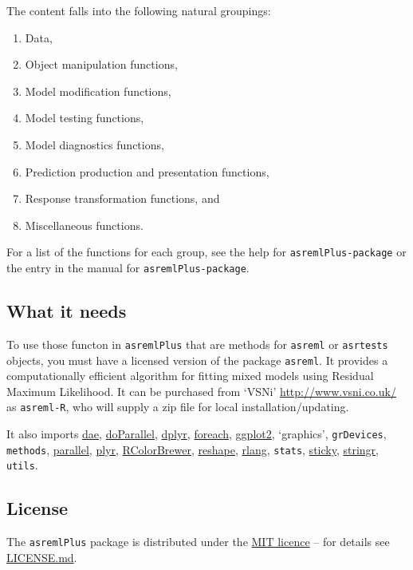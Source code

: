 \documentclass[
]{article}
\begin{document}
The content falls into the following natural groupings:

\begin{enumerate}
\def\labelenumi{(\roman{enumi})}
\item
  Data,
\item
  Object manipulation functions,
\item
  Model modification functions,
\item
  Model testing functions,
\item
  Model diagnostics functions,
\item
  Prediction production and presentation functions,
\item
  Response transformation functions, and
\item
  Miscellaneous functions.
\end{enumerate}

For a list of the functions for each group, see the help for
\texttt{asremlPlus-package} or the entry in the manual for
\texttt{asremlPlus-package}.

\hypertarget{what-it-needs}{%
\subsection{What it needs}\label{what-it-needs}}

To use those functon in \texttt{asremlPlus} that are methods for
\texttt{asreml} or \texttt{asrtests} objects, you must have a licensed
version of the package \texttt{asreml}. It provides a computationally
efficient algorithm for fitting mixed models using Residual Maximum
Likelihood. It can be purchased from `VSNi' \url{http://www.vsni.co.uk/}
as \texttt{asreml-R}, who will supply a zip file for local
installation/updating.

It also imports \href{https://CRAN.R-project.org/package=dae}{dae},
\href{https://CRAN.R-project.org/package=doParallel}{doParallel},
\href{https://CRAN.R-project.org/package=dplyr}{dplyr},
\href{https://CRAN.R-project.org/package=foreach}{foreach},
\href{https://CRAN.R-project.org/package=ggplot2}{ggplot2}, `graphics',
\texttt{grDevices}, \texttt{methods},
\href{https://CRAN.R-project.org/package=parallel}{parallel},
\href{https://CRAN.R-project.org/package=plyr}{plyr},
\href{https://CRAN.R-project.org/package=RColorBrewer}{RColorBrewer},
\href{https://CRAN.R-project.org/package=reshape}{reshape},
\href{https://CRAN.R-project.org/package=rlang}{rlang}, \texttt{stats},
\href{https://CRAN.R-project.org/package=sticky}{sticky},
\href{https://CRAN.R-project.org/package=stringr}{stringr},
\texttt{utils}.

\hypertarget{license}{%
\subsection{License}\label{license}}

The \texttt{asremlPlus} package is distributed under the
\href{https://opensource.org/licenses/MIT}{MIT licence} -- for details
see
\href{https://github.com/briencj/asremlPlus/blob/master/LICENSE.md}{LICENSE.md}.
\end{document}
